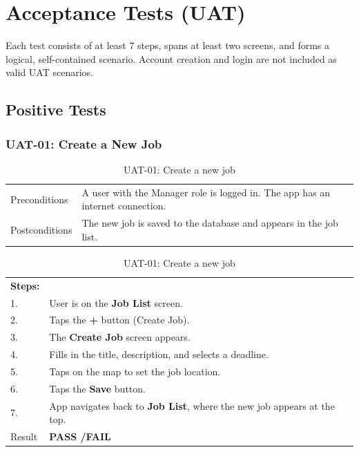 \chapter{Acceptance Tests (UAT)}

Each test consists of at least 7 steps, spans at least two screens, and forms a logical, self-contained scenario. Account creation and login are not included as valid UAT scenarios.

\section{Positive Tests}

\subsection*{UAT-01: Create a New Job}
\begin{table}[H]
  \centering
  \begin{tabularx}{\textwidth}{lX}
    \toprule
    Preconditions  & A user with the Manager role is logged in. The app has an internet connection. \\
    Postconditions & The new job is saved to the database and appears in the job list. \\
    \midrule
  \end{tabularx}
  \begin{tabularx}{\textwidth}{lX}
    \textbf{Steps:} & \\
    1. & User is on the \textbf{Job List} screen. \\
    2. & Taps the \textbf{+} button (Create Job). \\
    3. & The \textbf{Create Job} screen appears. \\
    4. & Fills in the title, description, and selects a deadline. \\
    5. & Taps on the map to set the job location. \\
    6. & Taps the \textbf{Save} button. \\
    7. & App navigates back to \textbf{Job List}, where the new job appears at the top. \\
    \midrule
    Result & \textbf{PASS \quad/\quad FAIL} \\
    \bottomrule
  \end{tabularx}
  \caption{UAT-01: Create a new job}
\end{table}

